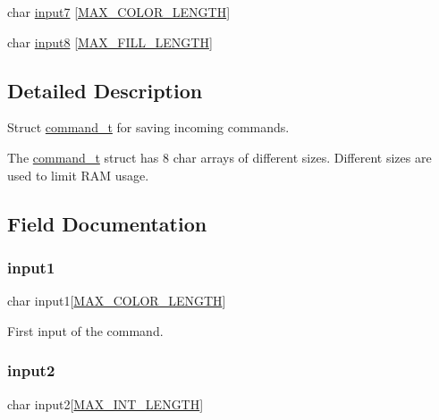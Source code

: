 \begin{DoxyCompactItemize}
\item 
char \mbox{\hyperlink{struct_l_l_1_1command__t_a5ad42f7fce183b561e059e686aea6fbf}{input7}} \mbox{[}\mbox{\hyperlink{group___global_ga9db5737c1a3aca5e334701167cae3e00}{M\+A\+X\+\_\+\+C\+O\+L\+O\+R\+\_\+\+L\+E\+N\+G\+TH}}\mbox{]}
\item 
char \mbox{\hyperlink{struct_l_l_1_1command__t_a11423f31c7aca444bf9639374decd9bc}{input8}} \mbox{[}\mbox{\hyperlink{group___global_ga2543b47347236bd1d0a2428cb40cc321}{M\+A\+X\+\_\+\+F\+I\+L\+L\+\_\+\+L\+E\+N\+G\+TH}}\mbox{]}
\end{DoxyCompactItemize}


\subsection{Detailed Description}
Struct \mbox{\hyperlink{struct_l_l_1_1command__t}{command\+\_\+t}} for saving incoming commands. 

The \mbox{\hyperlink{struct_l_l_1_1command__t}{command\+\_\+t}} struct has 8 char arrays of different sizes. Different sizes are used to limit R\+AM usage. 

\subsection{Field Documentation}
\mbox{\label{struct_l_l_1_1command__t_adde4065396e31487528868110c952672}} 
\subsubsection{\texorpdfstring{input1}{input1}}
{\footnotesize\ttfamily char input1\mbox{[}\mbox{\hyperlink{group___global_ga9db5737c1a3aca5e334701167cae3e00}{M\+A\+X\+\_\+\+C\+O\+L\+O\+R\+\_\+\+L\+E\+N\+G\+TH}}\mbox{]}}

First input of the command. \mbox{\label{struct_l_l_1_1command__t_acfad2cb4ebf4d78e6bcb762a4e802e0c}} 
\subsubsection{\texorpdfstring{input2}{input2}}
{\footnotesize\ttfamily char input2\mbox{[}\mbox{\hyperlink{group___global_ga641c7a7b2caa1f47c6663fdc497f226a}{M\+A\+X\+\_\+\+I\+N\+T\+\_\+\+L\+E\+N\+G\+TH}}\mbox{]}}


